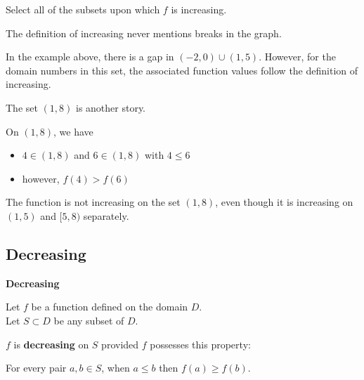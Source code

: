 \documentclass{ximera}
\begin{document}
\begin{example}
\begin{question}

Select all of the subsets upon which $f$ is increasing.


\begin{selectAll}
\end{selectAll}
\end{question}





\end{example}
The definition of increasing never mentions breaks in the graph. 

In the example above, there is a gap in $(-2,0) \cup (1,5)$.  However, for the domain numbers in this set, the associated function values follow the definition of increasing.   

The set $(1,8)$ is another story.


On $(1,8)$, we have 

\begin{itemize}
\item $4 \in (1,8)$  and  $6 \in (1,8)$  with $4 \leq 6$ 
\item however, $f(4) > f(6)$
\end{itemize}


The function is not increasing on the set $(1,8)$, even though it is increasing on $(1,5)$ and $[5,8)$ separately. 














\subsection*{Decreasing}



\begin{definition} \textbf{\textcolor{green!50!black}{Decreasing}} 


Let $f$ be a function defined on the domain $D$. \\
Let $S \subset D$ be any subset of $D$.

$f$ is \textbf{decreasing} on $S$ provided $f$ possesses this property:  


\begin{center}
For every pair $a, b \in S$, when $a \leq b$ then $f(a) \geq f(b)$.
\end{center}

\end{definition}
\end{document}
